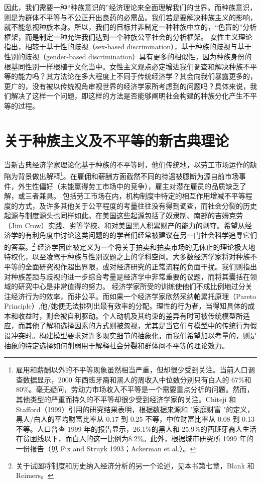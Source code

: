 \documentclass[UTF8]{ctexart}
\begin{document}
因此，我们需要一种“种族意识的”经济理论来全面理解我们的世界。而种族意识，则是为群体不平等与不公正开出良药的必需品。我们若是要解决种族主义的影响，就不能忽视种族本身。所以，我们的目标并非制定一种种族中立的，“色盲的”分析框架，而是制定一种允许我们达到一个种族公平社会的分析框架。
女性主义理论指出，相较于基于性的歧视（sex-based discrimination），基于种族的歧视与基于性别的歧视（gender-based discrimination）具有更多的相似性，因为种族身份的根基同性别一样根植于文化当中。女性主义观点必定增进我们调查和解决种族不平等的能力吗？其方法论在多大程度上不同于传统经济学？其会向我们暴露更多的，更广的，没有被以传统视角审视世界的经济学家所考虑到的问题吗？具体来说，我们解决了这样一个问题，即这样的方法是否能够阐明社会构建的种族分化产生不平等的过程。

\section{关于种族主义及不平等的新古典理论}当新古典经济学家理论化基于种族的不平等时，他们传统地，以劳工市场运作的缺陷为背景做出解释\footnote[2]{雇用和薪酬以外的不平等现象虽然相当严重，但却很少受到关注。当前人口调查数据显示，2000 年西班牙裔和黑人的周收入中位数分别只有白人的 67\%和 80\%。毫无疑问，劳动力市场收入不平等是一个需要重点分析的问题。然而，其他类型的严重而持久的不平等却很少受到经济学家的关注。Chiteji 和 Stafford（1999）引用的研究结果表明，根据数据来源和 "家庭财富 "的定义，黑人/白人的平均财富比率从 0.17 到 0.25 不等，中位财富比率从 0.08 到 0.13不等。人口普查 1999 年的报告显示，26.1\%的黑人和 25.9\%的西班牙裔人生活在贫困线以下，而白人的这一比例为8.2\%。此外，根据城市研究所 1999 年的一份报告（见 Fix and Struyk 1993；Ackerman et al.）。}。在雇佣和薪酬方面截然不同的待遇被臆断为源自前市场事件，外生性偏好（未能赢得劳工市场中的竞争），雇主对潜在雇员的品质缺乏了解，或三者兼具。
包括劳工市场在内，机构制度中特定的相互作用增减不平等程度的方式，及许多其他关于公平程度的考量往往没有得到调查，而社会分裂的历史起源与制度源头也同样如此。在美国这些起源包括了奴隶制、南部的吉姆克劳（Jim Crow）实践、劣等学校、和对美国黑人积累财产的能力的剥夺。希望从经济学的有利角度中讨论这类问题的的学者们经常被建议在另一门社会科学追寻它们的答案。\footnote[3]{关于试图将制度和历史纳入经济分析的另一个论述，见本书第七章，Blank 和 Reimers。}
经济学因此被定义为一个将关于拍卖和拍卖市场的无休止的理论极大地特权化，以至凌驾于种族与性别议题之上的学科空间。大多数经济学家将对种族不平等的全面研究视作超出界限，或对经济研究的正常流程的负面干扰。我们则指出对种族差距与歧视的进一步综合考量是经济学中非常重要的议题，而将其囊括在领域的研究中心是非常值得的努力。
经济学家所受的训练使他们不成比例地过分关注经济行为的效率，而非公平。而如果一个经济学家欣然采纳帕累托原理（Pareto Principle）,他/她便无法排列出最有效率的分配。理性的行为者，当得知具体的成本和收益时，则会被自利驱动。个人动机及其约束的差异有时可被传统模型所适应，而其他了解和选择因素的方式则被忽视，尤其是当它们与模型中的传统行为假设冲突时。构建模型要求对许多现实细节的抽象化，而我们希望加以考量的，则是抽象的特定选择如何削弱用于解释社会分裂和群体间不平等的理论效力。
\end{document}
